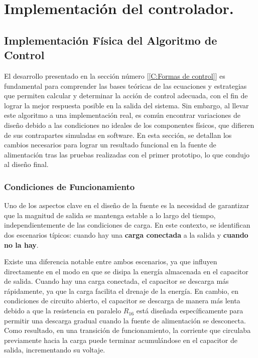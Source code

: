 \chapter{Implementación del controlador.}

\label{C:Implementación del algoritmo de control}
\section{Implementación Física del Algoritmo de Control}
El desarrollo presentado en la sección número [\ref{C:Formas de control}] es fundamental para comprender las bases teóricas de las ecuaciones y estrategias que permiten calcular y determinar la acción de control adecuada, con el fin de lograr la mejor respuesta posible en la salida del sistema. Sin embargo, al llevar este algoritmo a una implementación real, es común encontrar variaciones de diseño debido a las condiciones no ideales de los componentes físicos, que difieren de sus contrapartes simuladas en software. En esta sección, se detallan los cambios necesarios para lograr un resultado funcional en la fuente de alimentación tras las pruebas realizadas con el primer prototipo, lo que condujo al diseño final.\par

\subsection{Condiciones de Funcionamiento}
Uno de los aspectos clave en el diseño de la fuente es la necesidad de garantizar que la magnitud de salida se mantenga estable a lo largo del tiempo, independientemente de las condiciones de carga. En este contexto, se identifican dos escenarios típicos: cuando hay una \textbf{carga conectada} a la salida y \textbf{cuando no la hay}. \par
Existe una diferencia notable entre ambos escenarios, ya que influyen directamente en el modo en que se disipa la energía almacenada en el capacitor de salida. Cuando hay una carga conectada, el capacitor se descarga más rápidamente, ya que la carga facilita el drenaje de la energía. En cambio, en condiciones de circuito abierto, el capacitor se descarga de manera más lenta debido a que la resistencia en paralelo $R_{16}$ está diseñada específicamente para permitir una descarga gradual cuando la fuente de alimentación se desconecta. Como resultado, en una transición de funcionamiento, la corriente que circulaba previamente hacia la carga puede terminar acumulándose en el capacitor de salida, incrementando su voltaje. \par

